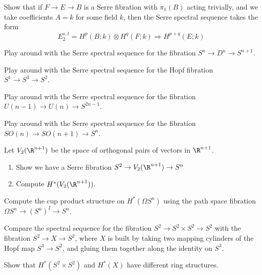 \begin{xca}
	Show that if $F \to E \to B$ is a Serre fibration with $\pi_1(B)$ acting trivially, and we take coefficients $A = k$ for some field $k$, then the Serre spectral sequence takes the form 
	$$E_2^{s,t} = H^p(B;k) \otimes H^q(F;k) \Rightarrow H^{p+q}(E;k)$$
\end{xca}

\begin{xca}
	Play around with the Serre spectral sequence for the fibration $S^n \to D^n \to S^{n+1}$.
\end{xca}

\begin{xca}
	Play around with the Serre spectral sequence for the Hopf fibration $S^1 \to S^3 \to S^2$.
\end{xca}

\begin{xca}
	Play around with the Serre spectral sequence for the fibration $U(n-1) \to U(n) \to S^{2n-1}$.
\end{xca}

\begin{xca}
	Play around with the Serre spectral sequence for the fibration $SO(n) \to SO(n+1) \to S^n$.
\end{xca}

\begin{xca}
	Let $V_2(\R^{n+1})$ be the space of orthogonal pairs of vectors in $\R^{n+1}$.
	
	
	\begin{enumerate}
		\item Show we have a Serre fibration $S^2 \to V_2(\R^{n+1}) \to S^n$
		\item Compute $H^*(V_2(\R^{n+1}))$.
	\end{enumerate}
	
\end{xca}

\begin{xca}
	Compute the cup product structure on $H^*(\Omega S^n)$ using the path space fibration $\Omega S^n \to (S^n)^I \to S^n$.
\end{xca}

\begin{xca}
	Compare the spectral sequence for the fibration $S^2 \to S^2 \times S^2 \to S^2$ with the fibration $S^2 \to X \to S^2$, where $X$ is built by taking two mapping cylinders of the Hopf map $S^3 \to S^2$, and gluing them together along the identity on $S^3$.
	
	Show that $H^*(S^2 \times S^2)$ and $H^*(X)$ have different ring structures.
	
\end{xca}

